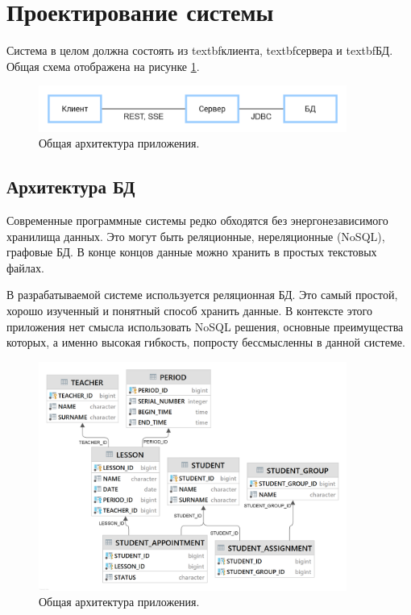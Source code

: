 \section{Проектирование системы}\label{sec:part2}
Система в целом должна состоять из textbf{клиента}, textbf{сервера} и textbf{БД}.
Общая схема отображена на рисунке \ref{fig:mainArchitecture}.

\begin{figure}[ht]
    \centering
    \includegraphics[width=0.9\textwidth]{../resources/mainSystem.png}
    \caption{Общая архитектура приложения.}
    \label{fig:mainArchitecture}
\end{figure}

\subsection{Архитектура БД}
Современные программные системы редко обходятся без энергонезависимого хранилища данных.
Это могут быть реляционные, нереляционные (NoSQL), графовые БД.
В конце концов данные можно хранить в простых текстовых файлах.

В разрабатываемой системе используется реляционная БД.
Это самый простой, хорошо изученный и понятный способ хранить данные.
В контексте этого приложения нет смысла использовать NoSQL решения, основные преимущества которых, а именно высокая гибкость, попросту бессмысленны в данной системе.

\begin{figure}[ht]
    \centering
    \includegraphics[width=0.9\textwidth]{../resources/schemaSQL.png}
    \caption{Общая архитектура приложения.}
    \label{fig:mainDBArchitecture}
\end{figure}

